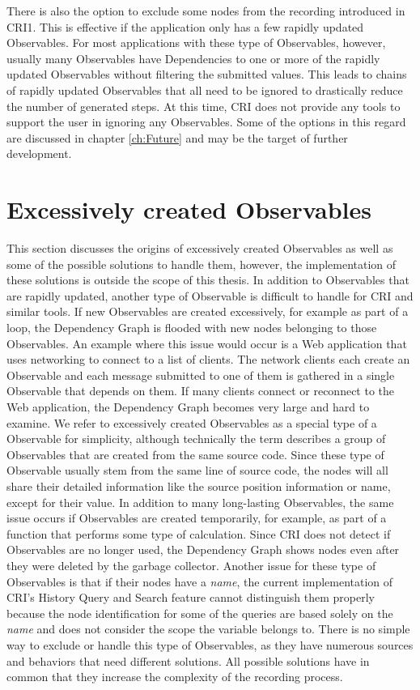 There is also the option to exclude some nodes from the recording introduced in CRI1. This is effective if the application only has a few rapidly updated Observables. For most applications with these type of Observables, however, usually many Observables have Dependencies to one or more of the rapidly updated Observables without filtering the submitted values. This leads to chains of rapidly updated Observables that all need to be ignored to drastically reduce the number of generated steps. At this time, CRI does not provide any tools to support the user in ignoring any Observables. Some of the options in this regard are discussed in chapter \ref{ch:Future} and may be the target of further development.

\section{Excessively created Observables}
\label{sec:DynamicallyCreated}
This section discusses the origins of excessively created Observables as well as some of the possible solutions to handle them, however, the implementation of these solutions is outside the scope of this thesis.
In addition to Observables that are rapidly updated, another type of Observable is difficult to handle for CRI and similar tools. If new Observables are created excessively, for example as part of a loop, the Dependency Graph is flooded with new nodes belonging to those Observables. An example where this issue would occur is a Web application that uses networking to connect to a list of clients. The network clients each create an Observable and each message submitted to one of them is gathered in a single Observable that depends on them. If many clients connect or reconnect to the Web application, the Dependency Graph becomes very large and hard to examine. We refer to excessively created Observables as a special type of a Observable for simplicity, although technically the term describes a group of Observables that are created from the same source code. Since these type of Observable usually stem from the same line of source code, the nodes will all share their detailed information like the source position information or name, except for their value. In addition to many long-lasting Observables, the same issue occurs if Observables are created temporarily, for example, as part of a function that performs some type of calculation. Since CRI does not detect if Observables are no longer used, the Dependency Graph shows nodes even after they were deleted by the garbage collector. Another issue for these type of Observables is that if their nodes have a \emph{name}, the current implementation of CRI's History Query and Search feature cannot distinguish them properly because the node identification for some of the queries are based solely on the \emph{name} and does not consider the scope the variable belongs to.
There is no simple way to exclude or handle this type of Observables, as they have numerous sources and behaviors that need different solutions. All possible solutions have in common that they increase the complexity of the recording process.


